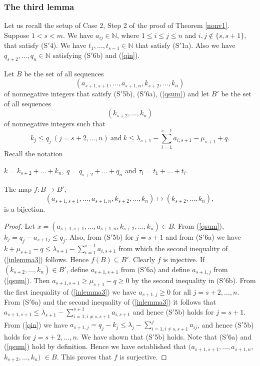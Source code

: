 \documentclass[ALCO,Unicode]{cedram}
\newcommand{\m}{\mu}
\numberwithin{equation}{section}
\begin{document}
	\subsubsection{The third lemma}
	Let us recall the setup of Case 2, Step 2 of the proof of Theorem \ref{nonv1}. Suppose $1 < s < m$. We have $a_{ij} \in \mathbb{N}$, where $1 \le i \le j \le n$ and $i,j \notin \{s, s+1\}$, that satisfy (S$'$4). We have $t_1,\dots,t_{s-1} \in \mathbb{N}$ that satisfy (S$'$1a). Also we have $q_{s+2},\dots,q_n \in \mathbb{N}$ satisfying (S$'$6b) and (\ref{qin}). 
	
	Let $B$ be the set of all sequences  \[(a_{s+1,s+1},\dots,a_{s+1,n},k_{s+2},\dots,k_{n})\] of nonnegative integers that satisfy (S$'$5b), (S$'$6a), (\ref{qsum}) and let $B'$ be the set of all sequences  \[(k_{s+2},\dots,k_{n})\] of nonnegative integers such that \begin{equation}\label{inlemma3} k_j \le q_j  \  (j=s+2,\dots,n) \  \text{and} \  k \le \lambda_{s+1}-\sum_{i=1}^{s-1}a_{i,s+1}-\mu_{s+1}+q.\end{equation}
	Recall the notation \begin{center}
		$k= k_{s+2}+\dots+k_n, \  q=q_{s+2}+\dots+q_n$ and $\tau_i=t_1+\dots+t_i$.
	\end{center}
	\begin{lemma}\label{lemma3}The map $f:B \to B'$, \[(a_{s+1,s+1},\dots,a_{s+1,n},k_{s+2},\dots,k_{n}) \mapsto (k_{s+2},\dots,k_{n}),\] is a bijection.
		\begin{proof} Let $x=(a_{s+1,s+1},\dots,a_{s+1,n},k_{s+2},\dots,k_{n}) \in B$. From (\ref{qsum}), $k_j=q_j-a_{s+1j} \le q_j$. Also, from (S$'$5b)  for $j=s+1$ and from (S$'$6a) we have $k+\mu_{s+1}-q \le \lambda_{s+1}-\sum_{i=1}^{s-1}a_{i,s+1}$ from which the second inequality of (\ref{inlemma3}) follows. Hence $f(B) \subseteq B'$. Clearly $f$ is injective. If $(k_{s+2},\dots,k_{n}) \in B'$, define $a_{s+1,s+1}$ from (S$'$6a) and define $a_{s+1,j}$ from (\ref{qsum}). Then $a_{s+1,s+1} \ge \m_{s+1}-q \ge 0$ by the second inequality in (S$'$6b). From the first inequality of (\ref{inlemma3}) we have $a_{s+1,j} \ge 0$ for all $j=s+2,\dots,n$. From (S$'$6a) and the second inequality of (\ref{inlemma3}) it follows that $a_{s+1,s+1} \le \lambda_{s+1} -\sum_{i=1, i \neq s,s+1}^{s+1}a_{i,s+1}$ and hence (S$'$5b) holds for $j=s+1$. From (\ref{qin}) we have $a_{s+1,j}=q_j-k_j \le \lambda_j-\sum_{i=1, i \neq s,s+1}^{j}a_{ij}$, and hence 
			(S$'$5b) holds for $j=s+2,\dots,n$. We have shown that (S$'$5b) holds. Note that (S$'$6a) and (\ref{qsum}) hold by definition. Hence we have established that $(a_{s+1,s+1},\dots,a_{s+1,n},$ $k_{s+2},\dots,k_n)$ $ \in B$. This proves that $f$ is surjective.
		\end{proof}
	\end{lemma}
	
\end{document}
